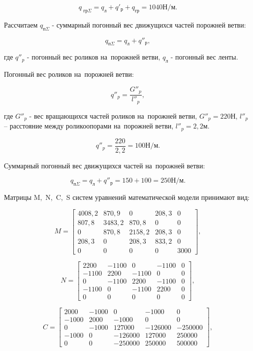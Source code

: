 $$ q_{\text{ гр} \Sigma} = q_{\text{л}} + q'_{\text{р}} + q_{\text{гр}} = 1040 \text{Н/м}. $$

Рассчитаем $ q_{\text{п} \Sigma} $ - суммарный погонный вес движущихся частей порожней ветви:

$$ q_{\text{п} \Sigma} = q_{\text{л}} + q''_{\text{р}}, $$

где $ q''_p $ - погонный вес роликов на~порожней ветви, $ q_{\text{л}} $ - погонный вес ленты.

Погонный вес роликов на~порожней ветви: 

$$ q''_p = \frac{G''_p}{l''_p}, $$

где $ G''_p $ - вес вращающихся частей роликов на~порожней ветви, $ G''_p = 220 \text{Н} $, $ l''_p $ – расстояние между роликоопорами на~порожней ветви, $ l''_p = 2,2 \text{м}. $

$$ q''_p = \frac{220}{2,2} = 100 \text{Н/м}. $$

Суммарный погонный вес движущихся частей на~порожней ветви:

$$ q_{\text{п} \Sigma} = q_{\text{л}} + q''_{\text{р}} = 150 + 100 = 250 \text{Н/м}. $$

Матрицы M,~N,~C,~S систем уравнений математической модели принимают вид:

$$ 
M = 
\begin{bmatrix}
	4008,2 & 870,9  & 0      & 208,3 & 0    \\
	807,8  & 3483,2 & 870,8  & 0     & 0    \\
	0      & 870,8  & 2158,2 & 208,3 & 0    \\
	208,3  & 0      & 208,3  & 833,2 & 0    \\
	0      & 0      & 0      & 0     & 3000
\end{bmatrix},
$$

$$
N = 
\begin{bmatrix}
	2200  & -1100 & 0     & -1100 & 0       \\
	-1100 & 2200  & -1100 & 0     & 0       \\
	0     & -1100 & 2200  & -1100 & 0       \\
	-1100 & 0     & -1100 & 2200  & 0       \\
	0     & 0     & 0     & 0     & 0
\end{bmatrix},
$$

$$ 
C = 
\begin{bmatrix}
	2000  & -1000 & 0       & -1000   & 0       \\
	-1000 & 2000  & -1000   & 0       & 0       \\
	0     & -1000 & 127000  & -126000 & -250000 \\
	-1000 & 0     & -126000 & 127000  & 250000  \\
	0     & 0     & -250000 &  250000 & 500000
\end{bmatrix},
$$

